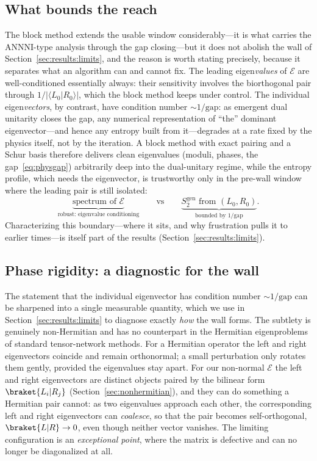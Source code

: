 \subsection{What bounds the reach}
\label{sec:reach}

The block method extends the usable window considerably---it is what carries the ANNNI-type analysis through the gap closing---but it does not abolish the wall of Section~\ref{sec:results:limits}, and the reason is worth stating precisely, because it separates what an algorithm can and cannot fix. The leading eigen\emph{values} of $\mathcal{E}$ are well-conditioned essentially always: their sensitivity involves the biorthogonal pair through $1/|\langle L_0|R_0\rangle|$, which the block method keeps under control. The individual eigen\emph{vectors}, by contrast, have condition number $\sim 1/\mathrm{gap}$: as emergent dual unitarity closes the gap, any numerical representation of ``the'' dominant eigenvector---and hence any entropy built from it---degrades at a rate fixed by the physics itself, not by the iteration. A block method with exact pairing and a Schur basis therefore delivers clean eigenvalues (moduli, phases, the gap~\eqref{eq:physgap}) arbitrarily deep into the dual-unitary regime, while the entropy profile, which needs the eigenvector, is trustworthy only in the pre-wall window where the leading pair is still isolated:
\begin{equation}
  \underbrace{\text{spectrum of } \mathcal{E}}_{\text{robust: eigenvalue conditioning}}
  \qquad\text{vs}\qquad
  \underbrace{S^{\mathrm{gen}}_2 \text{ from } (L_0, R_0)}_{\text{bounded by } 1/\text{gap}} .
  \label{eq:reach}
\end{equation}
Characterizing this boundary---where it sits, and why frustration pulls it to earlier times---is itself part of the results (Section~\ref{sec:results:limits}).

\subsection{Phase rigidity: a diagnostic for the wall}
\label{sec:rigidity}

The statement that the individual eigenvector has condition number $\sim1/\mathrm{gap}$ can be sharpened into a single measurable quantity, which we use in Section~\ref{sec:results:limits} to diagnose exactly \emph{how} the wall forms. The subtlety is genuinely non-Hermitian and has no counterpart in the Hermitian eigenproblems of standard tensor-network methods. For a Hermitian operator the left and right eigenvectors coincide and remain orthonormal; a small perturbation only rotates them gently, provided the eigenvalues stay apart. For our non-normal $\mathcal{E}$ the left and right eigenvectors are distinct objects paired by the bilinear form $\braket{L_i|R_j}$ (Section~\ref{sec:nonhermitian}), and they can do something a Hermitian pair cannot: as two eigenvalues approach each other, the corresponding left and right eigenvectors can \emph{coalesce}, so that the pair becomes self-orthogonal, $\braket{L|R}\to0$, even though neither vector vanishes. The limiting configuration is an \emph{exceptional point}, where the matrix is defective and can no longer be diagonalized at all.

